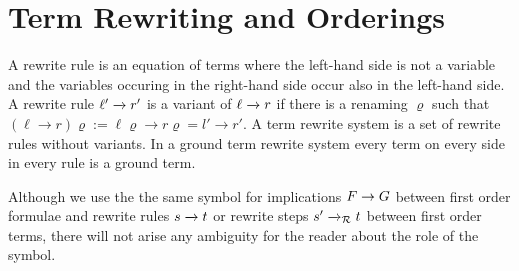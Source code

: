 

\section{Term Rewriting and Orderings}\label{sec:termrewriting}




\begin{definition}\label{def:rewriterule}
	A {\myem rewrite rule} is an equation of terms where the left-hand side is not a variable
	and the variables occuring in the right-hand side occur also in the left-hand side.
	A rewrite rule $\ell'\xrightarrow[{}]{} r'$ is a {\myem variant} of $\ell\xrightarrow[{}]{} r$ if there is a renaming $\varrho$
	such that
	$(\ell\rightarrow r)\varrho := \ell\varrho\rightarrow r\varrho = l'\rightarrow r'$.
	A {\myem term rewrite system} is a set of rewrite rules without variants.
	In a {\myem ground} term rewrite system every term on every side in every rule is a ground term.
\end{definition}

Although we use the the same symbol for implications $F\rightarrow G$ between first order formulae
and rewrite rules $s\xrightarrow[{}]{} t$ or rewrite steps $s'\xrightarrow[{}]{}_{\mathcal{R}} t$ between first order terms,
there will not arise any ambiguity for the reader about the role of the symbol.

